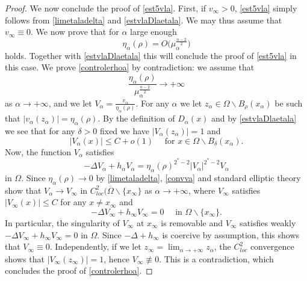 \documentclass[10pt]{amsart}
\numberwithin{equation}{section}
\newcommand{\Om}{\Omega}
\newcommand{\ma}{\mu_\alpha}
\def \xl{x_\alpha}
\def \ma{\mu_{\alpha}}
\def \ro{\rho}
\theoremstyle{plain}
\theoremstyle{remark}
\begin{document}
\begin{proof}
We now conclude the proof of \eqref{est5vla}. First, if $v_\infty >0$, \eqref{est5vla} simply follows from \eqref{limetaladelta} and \eqref{estvlaDlaetala}. We may thus assume that $v_\infty \equiv 0$. We now prove that for $\alpha$ large enough 
\begin{equation} \label{controlerhoa}
\eta_\alpha(\rho) = O\big( \ma^{\frac{n-2}{2}} \big)
\end{equation}
holds. Together with  \eqref{estvlaDlaetala} this will conclude the proof of  \eqref{est5vla} in this case. We prove \eqref{controlerhoa} by contradiction: we assume that 
\begin{equation} \label{controlerhoa2}
\frac{\eta_\alpha(\rho)}{\ma^{\frac{n-2}{2}}} \to + \infty 
\end{equation}
as $\alpha \to + \infty$, and we let $V_\alpha = \frac{v_\alpha}{\eta_\alpha(\rho)}$. For any $\alpha$ we let $z_\alpha \in \Om\backslash B_{\ro}(\xl)$ be such that $|v_\alpha(z_\alpha)| = \eta_\alpha(\rho)$. By the definition of $D_\alpha(x)$ and by  \eqref{estvlaDlaetala} we see that for any $\delta >0$ fixed we have $|V_\alpha(z_\alpha)|=1$ and 
\begin{equation} \label{convva}
|V_\alpha(x)| \le C + o(1) \quad \text{ for } x \in \Om \backslash B_{\delta}(\xl). 
\end{equation}
Now, the function $V_\alpha$ satisfies 
\begin{equation*}
-\Delta V_\alpha +h_\alpha V_\alpha  =\eta_\alpha(\rho)^{2^*-2}|V_\alpha|^{2^*-2} V_\alpha
\end{equation*} 
in $\Om$. Since $\eta_\alpha(\rho) \to 0$ by  \eqref{limetaladelta}, \eqref{convva} and standard elliptic theory show that $V_\alpha \to V_\infty$ in $C^2_{loc}(\overline{\Om} \backslash \{x_\infty\}$ as $\alpha \to + \infty$, where $V_\infty$ satisfies $|V_\infty(x)| \le C$ for any $x \neq x_\infty$ and 
\begin{equation*}
-\Delta V_\infty +h_\infty V_\infty  =0 \quad \text{ in }  \Om \backslash \{x_\infty\}. 
\end{equation*} 
In particular, the singularity of $V_\infty$ at $x_\infty$ is removable and $V_\infty$ satisfies weakly $-\Delta V_\infty +h_\infty V_\infty  =0$ in $\Om$. Since $- \Delta + h_\infty$ is coercive by assumption, this shows that $V_\infty \equiv 0$. Independently, if we let $z_\infty = \lim_{\alpha \to + \infty} z_\alpha$, the $C^2_{loc}$ convergence shows that $|V_\infty(z_\infty)| = 1$, hence $V_\infty \not \equiv 0$. This is a contradiction, which concludes the proof of \eqref{controlerhoa}.
\end{proof}
\end{document}
